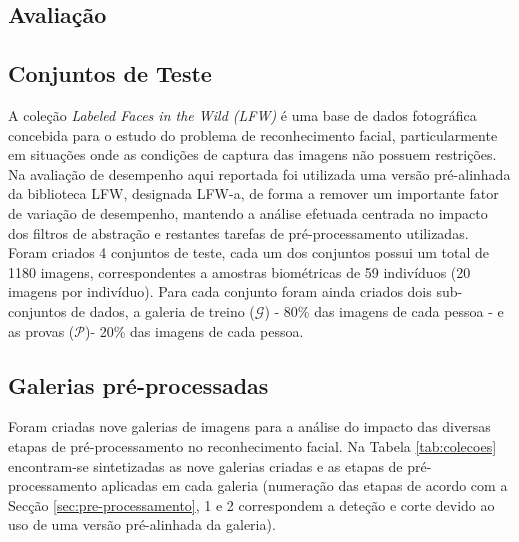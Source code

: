\documentclass[9pt,a4paper]{extarticle}
\begin{document}
\begin{multicols}{2}
\section{Avaliação}
\subsection{Conjuntos de Teste} \label{sec:conjuntos}
A coleção \textit{Labeled Faces in the Wild (LFW)} \cite{Huang2007} é uma base de dados fotográfica concebida para o estudo do problema de reconhecimento facial, particularmente em situações onde as condições de captura das imagens não possuem restrições. Na avaliação de desempenho aqui reportada foi utilizada uma versão pré-alinhada da biblioteca LFW, designada LFW-a, de forma a remover um importante fator de variação de desempenho, mantendo a análise efetuada centrada no impacto dos filtros de abstração e restantes tarefas de pré-processamento utilizadas. Foram criados 4 conjuntos de teste, cada um dos conjuntos possui um total de 1180 imagens, correspondentes a amostras biométricas de 59 indivíduos (20 imagens por indivíduo). Para cada conjunto foram ainda criados dois sub-conjuntos de dados, a galeria de treino ($\mathscr{G}$) - 80\% das imagens de cada pessoa - e as provas ($\mathscr{P}$)- 20\% das imagens de cada pessoa.

\subsection{Galerias pré-processadas}
Foram criadas nove galerias de imagens para a análise do impacto das diversas etapas de pré-processamento no reconhecimento facial. Na Tabela \ref{tab:colecoes} encontram-se sintetizadas as nove galerias criadas e as etapas de pré-processamento aplicadas em cada galeria (numeração das etapas de acordo com a Secção \ref{sec:pre-processamento}, 1 e 2 correspondem a deteção e corte devido ao uso de uma versão pré-alinhada da galeria).


\end{multicols}
\end{document}
